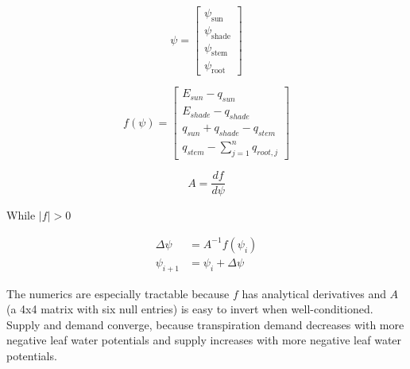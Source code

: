 \documentclass[draft,linenumbers]{agujournal}
\begin{document}
    \begin{linenomath*}
    \begin{equation} 
    \psi = \left[
    \begin{array}{c}
    \psi_{\text{sun}} \\ 
    \psi_{\text{shade}} \\ 
    \psi_{\text{stem}} \\ 
    \psi_{\text{root}}            
    \end{array} \right]
    \end{equation}
    \end{linenomath*}
    
    \begin{linenomath*}
    \begin{equation}
    f\left(\psi\right) = \left[ 
    \begin{array}{c}
    E_{sun}-q_{sun}\\
    E_{shade}-q_{shade}\\
    q_{sun}+q_{shade}-q_{stem}\\
    q_{stem}-\sum_{j=1}^n{q_{root,j}}
    \end{array} \right]
    \end{equation}
    \end{linenomath*}
    
    \begin{linenomath*}
    \begin{equation}
    A = \dfrac{df}{d\psi}
    \end{equation}
    \end{linenomath*}    
    
    While $\left|f\right|>0$
    \begin{linenomath*}
    \begin{equation} \begin{aligned}
    \label{eq:iter}
    \Delta\psi &=A^{-1}f\left(\psi_i\right) \\
    \psi_{i+1}  &= \psi_i + \Delta\psi
    \end{aligned} \end{equation}
    \end{linenomath*}    
    
    The numerics are especially tractable because $f$ has analytical derivatives and $A$ 
    (a 4x4 matrix with six null entries) is easy to invert when well-conditioned. 
    Supply and demand converge, because transpiration demand decreases with more negative 
    leaf water potentials and supply increases with more negative leaf water potentials.
    
\end{document}
